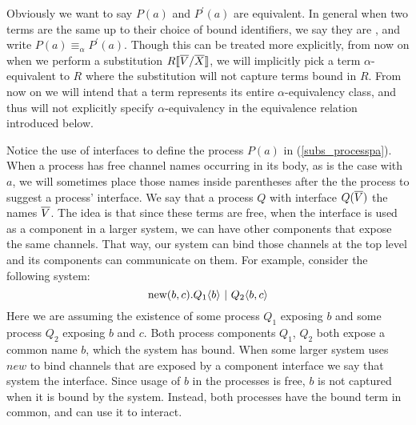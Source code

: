 Obviously we want to say $P(a)$ and $P^{'}(a)$ are equivalent.  
In general when two terms are the same up to their choice of bound identifiers, we say they are , and write $P(a) \equiv_\alpha P^{'}(a)$.  
Though this can be treated more explicitly, from now on when we perform a substitution $R\llbracket{ \ensuremath{\overline{V}} }/{\overline{X}}\rrbracket$, we will implicitly pick a term $\alpha$-equivalent to $R$ where the substitution will not capture terms bound in $R$.  
From now on we will intend that a term represents its entire $\alpha$-equivalency class, and thus will not explicitly specify $\alpha$-equivalency in the equivalence relation introduced below.

Notice the use of interfaces to define the process $P(a)$ in (\ref{subs_processpa}).
When a process has free channel names occurring in its body, as is the case with $a$, we will sometimes place those names inside parentheses after the the process to suggest a process' interface.  
We say that a process $Q$ with interface $Q(\overline{V})$  the names $\overline{V}$.  
The idea is that since these terms are free, when the interface is used as a component in a larger system, we can have other components that expose the same channels.  
That way, our system can bind those channels at the top level and its components can communicate on them.  
For example, consider the following system:
\[
	\text{new}({b,c}).Q_1\langle b\rangle \ |\  Q_2\langle b,c\rangle
\]
Here we are assuming the existence of some process $Q_1$ exposing $b$ and some process $Q_2$ exposing $b$ and $c$.  Both process components $Q_1$, $Q_2$ both expose a common name $b$, which the system has bound.  
When some larger system uses $new$ to bind channels that are exposed by a component interface we say that system  the interface.
Since usage of $b$ in the processes is free, $b$ is not captured when it is bound by the system.  
Instead, both processes have the bound term in common, and can use it to interact.

